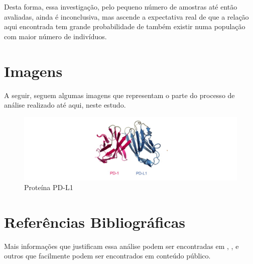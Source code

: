 \documentclass[a4paper,12pt]{article}
\begin{document}
Desta forma, essa investigação, pelo pequeno número de amostras até então avaliadas, ainda é inconclusiva, mas ascende a expectativa real de que a relação aqui encontrada tem grande probabilidade de também existir numa população com maior número de indivíduos. 

\section{Imagens}\label{sec:figs}

A seguir, seguem algumas imagens que representam o parte do processo de análise realizado até aqui, neste estudo.

\begin{figure}[ht]
\centering
\includegraphics[width=1 \textwidth]{pdl1.jpg}
\caption{Proteína PD-L1}
\label{fig:PD-L1}
\end{figure}



\section{Referências Bibliográficas}
Mais informações que justificam essa análise podem ser encontradas em \cite{brahmer2012safety}, \cite{reck2016pembrolizumab}, \cite{iwai2002involvement} e outros que facilmente podem ser encontrados em conteúdo público.



\end{document}
